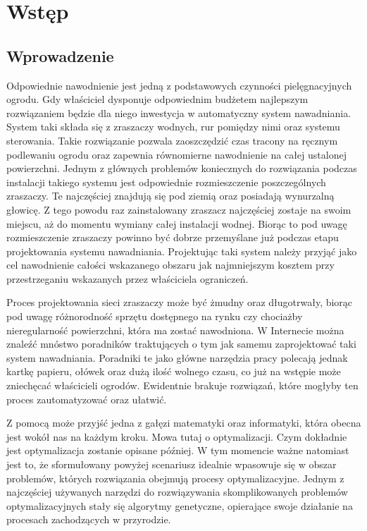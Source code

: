 \documentclass[twoside]{iisthesis}
\begin{document}
\maketitle

\textpages


\graphicspath{ {img/} }
\chapter{Wstęp}
\section{Wprowadzenie}
Odpowiednie nawodnienie jest jedną z podstawowych czynności pielęgnacyjnych ogrodu. Gdy właściciel dysponuje odpowiednim budżetem najlepszym rozwiązaniem będzie dla niego inwestycja w automatyczny system nawadniania. System taki składa się z zraszaczy wodnych, rur pomiędzy nimi oraz systemu sterowania. Takie rozwiązanie pozwala zaoszczędzić czas tracony na ręcznym podlewaniu ogrodu oraz zapewnia równomierne nawodnienie na całej ustalonej powierzchni. Jednym z głównych problemów koniecznych do rozwiązania podczas instalacji takiego systemu jest odpowiednie rozmieszczenie poszczególnych zraszaczy. Te najczęściej znajdują się pod ziemią oraz posiadają wynurzalną głowicę. Z tego powodu raz zainstalowany zraszacz najczęściej zostaje na swoim miejscu, aż do momentu wymiany całej instalacji wodnej. Biorąc to pod uwagę rozmieszczenie zraszaczy powinno być dobrze przemyślane już podczas etapu projektowania systemu nawadniania. Projektując taki system należy przyjąć jako cel nawodnienie całości wskazanego obszaru jak najmniejszym kosztem przy przestrzeganiu wskazanych przez właściciela ograniczeń.

Proces projektowania sieci zraszaczy może być żmudny oraz długotrwały, biorąc pod uwagę różnorodność sprzętu dostępnego na rynku czy chociażby nieregularność powierzchni, która ma zostać nawodniona. W Internecie można znaleźć mnóstwo poradników traktujących o tym jak samemu zaprojektować taki system nawadniania. Poradniki te jako główne narzędzia pracy polecają jednak kartkę papieru, ołówek oraz dużą ilość wolnego czasu, co już na wstępie może zniechęcać właścicieli ogrodów. Ewidentnie brakuje rozwiązań, które mogłyby ten proces zautomatyzować oraz ułatwić.
 
Z pomocą może przyjść jedna z gałęzi matematyki oraz informatyki, która obecna jest wokół nas na każdym kroku. Mowa tutaj o optymalizacji. Czym dokładnie jest optymalizacja zostanie opisane później. W tym momencie ważne natomiast jest to, że sformułowany powyżej scenariusz idealnie wpasowuje się w obszar problemów, których rozwiązania obejmują procesy optymalizacyjne. Jednym z najczęściej używanych narzędzi do rozwiązywania skomplikowanych problemów optymalizacyjnych stały się algorytmy genetyczne, opierające swoje działanie na procesach zachodzących w przyrodzie.
\end{document}

